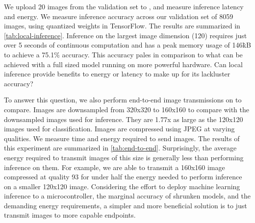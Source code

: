 We upload 20 images from the validation set to \name, and measure inference latency and energy. We measure inference accuracy across our validation set of 8059 images, using quantized weights in TensorFlow.
The results are summarized in \cref{tab:local-inference}. Inference on the largest image dimension (120) requires just over 5 seconds of continuous computation and has a peak memory usage of 146\.kB to achieve a 75.1\% accuracy. This accuracy pales in comparison to what can be achieved with a full sized model running on more powerful hardware. Can local inference provide benefits to energy or latency to make up for its lackluster accuracy?

To answer this question, we also perform end-to-end image transmissions on \name to compare. Images are downsampled from 320x320 to 160x160 to compare with the downsampled images used for inference. They are 1.77x as large as the 120x120 images used for classification. Images are compressed using JPEG at varying qualities. We measure time and energy required to send images. The results of this experiment are summarized in \cref{tab:end-to-end}. Surprisingly, the average energy required to transmit images of this size is generally less than performing inference on them. 
For example, we are able to transmit a 160x160 image compressed at quality 93 for under half the energy needed to perform inference on a smaller 120x120 image.
Considering the effort to deploy machine learning inference to a microcontroller, the marginal accuracy of shrunken models, and the demanding energy requirements, a simpler and more beneficial solution is to just transmit images to more capable endpoints.


